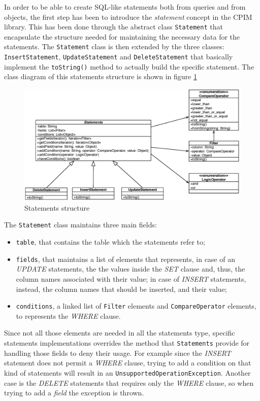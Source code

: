 \newparagraph In order to be able to create SQL-like statements both from queries and from objects, the first step has been to introduce the \textit{statement} concept in the CPIM library. This has been done through the abstract class \texttt{Statement} that encapsulate the structure needed for maintaining the necessary data for the statements.
The \texttt{Statement} class is then extended by the three classes: \texttt{InsertStatement}, \texttt{UpdateStatement} and \texttt{DeleteStatement} that basically implement the \texttt{toString()} method to actually build the specific statement.
The class diagram of this statements structure is shown in figure \ref{fig:statements}

\begin{figure}[tbh]
  \centering
  \includegraphics[width=13cm]{images/statements}
  \caption{Statements structure}
  \label{fig:statements}
\end{figure} 

\noindent The \texttt{Statement} class maintains three main fields:
\begin{itemize}
\item \texttt{table}, that contains the table which the statements refer to;
\item \texttt{fields}, that maintains a list of elements that represents, in case of an \textit{UPDATE} statements, the the values inside the \textit{SET} clause and, thus, the column names associated with their value; in case of \textit{INSERT} statements, instead, the column names that should be inserted, and their value;
\item \texttt{conditions}, a linked list of \texttt{Filter} elements and \texttt{CompareOperator} elements, to represents the \textit{WHERE} clause.
\end{itemize} 

\noindent Since not all those elements are needed in all the statements type, specific statements implementations overrides the method that \texttt{Statements} provide for handling those fields to deny their usage. For example since the \textit{INSERT} statement does not permit a \textit{WHERE} clause, trying to add a condition on that kind of statements will result in an \texttt{UnsupportedOperationException}. Another case is the \textit{DELETE} statements that requires only the \textit{WHERE} clause, so when trying to add a \textit{field} the exception is thrown.

